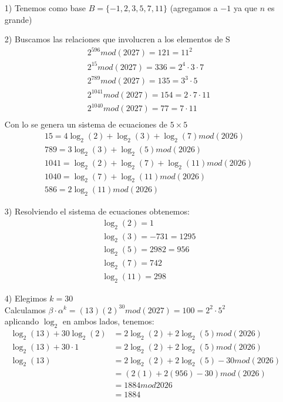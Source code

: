 \documentclass[12pt, letterpaper]{article}
\begin{document}
\begin{itemize}
\begin{itemize}
\item[1)] Tenemos como base $B = \{-1,2,3,5,7,11\}$ (agregamos a $-1$ ya que $n$ es grande)
\item[2)] Buscamos las relaciones que involucren a los elementos de S
\begin{equation*}
\begin{split}
&2^{596} mod (2027) = 121 = 11^2\\
&2^{15} mod (2027) = 336 = 2^4\cdot3\cdot7\\
&2^{789} mod (2027) = 135 = 3^3\cdot5\\
&2^{1041} mod (2027) = 154 = 2\cdot7\cdot11\\
&2^{1040} mod (2027) = 77 = 7\cdot11\\
\end{split}
\end{equation*}
Con lo se genera un sistema de ecuaciones de $5\times5$
\begin{equation*}
\begin{split}
&15 = 4\log_2(2) + \log_2(3)+\log_2(7) mod (2026)\\
&789 = 3\log_2(3) + \log_2(5) mod (2026)\\
&1041 = \log_2(2) + \log_2(7) + \log_2(11) mod (2026)\\
&1040 = \log_2(7) + \log_2(11) mod (2026)\\
&586 = 2\log_2(11) mod (2026)
\end{split}
\end{equation*}
\item[3)] Resolviendo el sistema de ecuaciones obtenemos:
\begin{equation*}
\begin{split}
&\log_2(2) = 1\\
&\log_2(3) = -731 = 1295\\
&\log_2(5) = 2982 = 956\\
&\log_2(7) = 742\\
&\log_2(11) = 298
\end{split}
\end{equation*}
\item[4)] Elegimos $k = 30$\\
Calculamos $\beta\cdot\alpha^k = (13)(2)^{30} mod(2027) = 100 = 2^2\cdot5^2$\\
aplicando $\log_2$ en ambos lados, tenemos:
\begin{equation*}
\begin{split}
\log_2(13) + 30\log_2(2) &= 2\log_2(2) + 2\log_2(5) mod (2026)\\
\log_2(13) + 30\cdot1 &= 2\log_2(2) + 2\log_2(5) mod (2026)\\
\log_2(13) &= 2\log_2(2) + 2\log_2(5) - 30 mod (2026)\\
	&= (2(1)+2(956) - 30) mod (2026)\\
	&= 1884 mod 2026\\
	&= 1884
\end{split}
\end{equation*}
\end{itemize}


\end{itemize}
\end{document}

